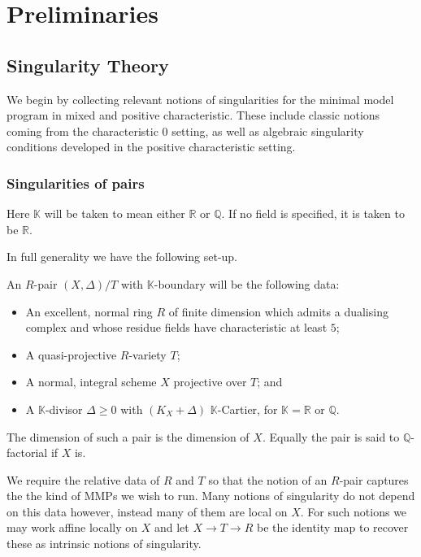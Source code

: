\documentclass[a4paper,12pt]{book}
\begin{document}
\chapter{Preliminaries}
\section{Singularity Theory}

We begin by collecting relevant notions of singularities for the minimal model program in mixed and positive characteristic. These include classic notions coming from the characteristic $0$ setting, as well as algebraic singularity conditions developed in the positive characteristic setting.

\subsection{Singularities of pairs}
Here $\mathbb{K}$ will be taken to mean either $\mathbb{R}$ or $\mathbb{Q}$. If no field is specified, it is taken to be $\mathbb{R}$.

In full generality we have the following set-up.

\begin{definition}\label{setup}
	An $R$-pair $(X,\Delta)/ T$ with $\mathbb{K}$-boundary will be the following data:
	\begin{itemize}
		\item An excellent, normal ring $R$ of finite dimension which admits a dualising complex and whose residue fields have characteristic at least $5$;
		\item A quasi-projective $R$-variety $T$;
		\item A normal, integral scheme $X$ projective over $T$; and
		\item A $\mathbb{K}$-divisor $\Delta \geq 0$ with $(K_{X}+\Delta)$ $\mathbb{K}$-Cartier, for $\mathbb{K}=\mathbb{R}$ or $\mathbb{Q}$.
	\end{itemize}
	
	The dimension of such a pair is the dimension of $X$. Equally the pair is said to $\mathbb{Q}$-factorial if $X$ is.
\end{definition}

\begin{remark}
	
	We require the relative data of $R$ and $T$ so that the notion of an $R$-pair captures the the kind of MMPs we wish to run. Many notions of singularity do not depend on this data however, instead many of them are local on $X$. For such notions we may work affine locally on $X$ and let $X \to T \to R$ be the identity map to recover these as intrinsic notions of singularity.
\end{remark}
\end{document}
